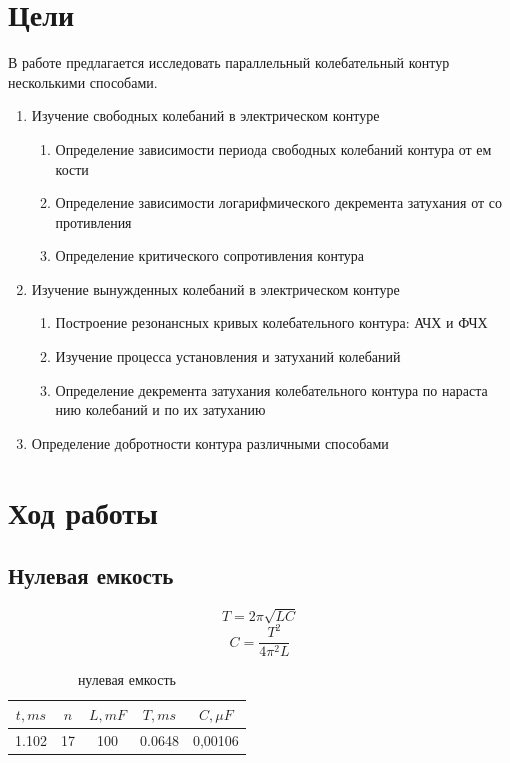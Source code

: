 \documentclass[a4paper, 12pt]{article}
\begin{document}
\newpage

\section{Цели}
В работе предлагается исследовать параллельный колебательный контур несколькими способами.
\begin{enumerate}
    \item  Изучение свободных колебаний в электрическом контуре
    \begin{enumerate}
        \item Определение зависимости периода свободных колебаний контура от ем
        кости
        \item Определение зависимости логарифмического декремента затухания от со
        противления
        \item Определение критического сопротивления контура
    \end{enumerate}
    \item Изучение вынужденных колебаний в электрическом контуре
    \begin{enumerate}
        \item Построение резонансных кривых колебательного контура: АЧХ и ФЧХ
        \item Изучение процесса установления и затуханий колебаний
        \item Определение декремента затухания колебательного контура по нараста
        нию колебаний и по их затуханию
    \end{enumerate}
    \item  Определение добротности контура различными способами
\end{enumerate}
\newpage


\section{Ход работы}
\subsection{Нулевая емкость}
    \[T=2\pi \sqrt{LC}\]
    \[C=\frac{T^2}{4\pi^2L}\]
    
\begin{table}[h]
    \centering
    \begin{tabular}{ccccc}
        \toprule
        $t, ms$&$n$&$L, mF$&$T, ms$&$C, \mu F$\\
        \midrule
        1.102&17&100&0.0648&0,00106\\
        \bottomrule
    \end{tabular}
        \caption{нулевая емкость}
\end{table}
\end{document}
